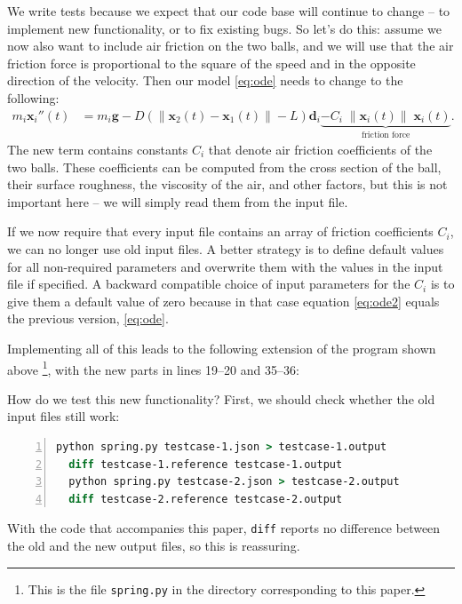 \documentclass{article}
\begin{document}
We write tests because we expect that our code base will continue to change --
to implement new functionality, or to fix existing bugs. So let's do this:
assume we now also want to include air friction on the two balls, and we will
use that the air friction force is proportional to the square of the speed and
in the opposite direction of the velocity. Then our model
\eqref{eq:ode} needs to change to the following:
\begin{align}
  \label{eq:ode2}
  m_i 
  \mathbf x_i''(t)
  &=
  m_i \mathbf g
  -
  D \left(\|\mathbf x_2(t) - \mathbf x_1(t)\| - L\right) \mathbf d_i
  \underbrace{-C_i \; \|\mathbf x_i(t)\| \; \mathbf x_i(t)}_{\text{friction force}}.
\end{align}
The new term contains constants $C_i$ that denote air friction coefficients of
the two balls. These coefficients can be computed from the cross section of
the ball, their surface roughness, the viscosity of the air, and other
factors, but this is not important here -- we will simply read them from the
input file.

If we now require that every input file contains an array of friction
coefficients $C_i$, we can no longer use old input files. A better strategy is
to define default values for all non-required parameters and overwrite them
with the values in the input file if specified. A backward compatible choice
of input parameters for the $C_i$ is to give them a default value of zero
because in that case equation \eqref{eq:ode2} equals the previous version,
\eqref{eq:ode}.

Implementing all of this leads to the following extension of the program shown
above%
\footnote{This is the file \texttt{spring.py} in the directory corresponding to
this paper.}, with the new parts in lines 19--20 and 35--36:


How do we test this new functionality? First, we should check whether the old input files still
work:
\begin{lstlisting}[frame=single,basicstyle=\footnotesize,numbers=left,language=csh]
  python spring.py testcase-1.json > testcase-1.output
  diff testcase-1.reference testcase-1.output
  python spring.py testcase-2.json > testcase-2.output
  diff testcase-2.reference testcase-2.output
\end{lstlisting}
With the code that accompanies this paper, \texttt{diff} reports no difference
between the old and the new output files, so this is reassuring.
\end{document}
